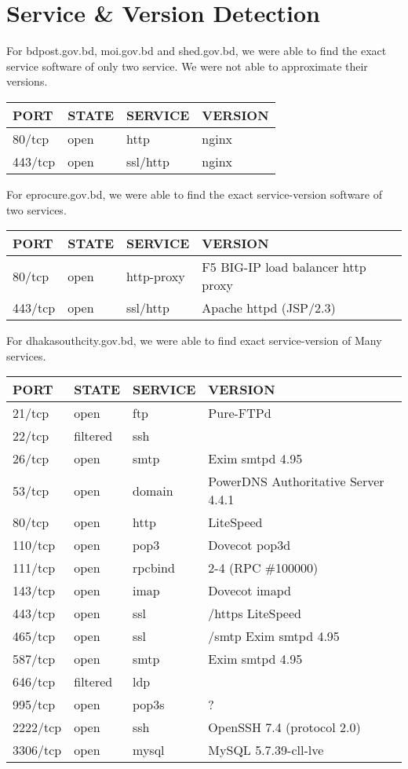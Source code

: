 \documentclass[11pt]{article}
\begin{document}
\section{Service \& Version Detection}
\label{sec:orgf64a93e}
For bdpost.gov.bd, moi.gov.bd and shed.gov.bd, we were able to find the exact service software of only two service. We were not able to approximate their versions.\\

\begin{center}
\begin{tabular}{llll}
PORT & STATE & SERVICE & VERSION\\
\hline
80/tcp & open & http & nginx\\
443/tcp & open & ssl/http & nginx\\
\end{tabular}
\end{center}

For eprocure.gov.bd, we were able to find the exact service-version software of two services.\\
\begin{center}
\begin{tabular}{llll}
PORT & STATE & SERVICE & VERSION\\
\hline
80/tcp & open & http-proxy & F5 BIG-IP load balancer http proxy\\
443/tcp & open & ssl/http & Apache httpd (JSP/2.3)\\
\end{tabular}
\end{center}

For dhakasouthcity.gov.bd, we were able to find exact service-version of Many services.\\
\begin{center}
\begin{tabular}{llll}
PORT & STATE & SERVICE & VERSION\\
\hline
21/tcp & open & ftp & Pure-FTPd\\
22/tcp & filtered & ssh & \\
26/tcp & open & smtp & Exim smtpd 4.95\\
53/tcp & open & domain & PowerDNS Authoritative Server 4.4.1\\
80/tcp & open & http & LiteSpeed\\
110/tcp & open & pop3 & Dovecot pop3d\\
111/tcp & open & rpcbind & 2-4 (RPC \#100000)\\
143/tcp & open & imap & Dovecot imapd\\
443/tcp & open & ssl & /https LiteSpeed\\
465/tcp & open & ssl & /smtp  Exim smtpd 4.95\\
587/tcp & open & smtp & Exim smtpd 4.95\\
646/tcp & filtered & ldp & \\
995/tcp & open & pop3s & ?\\
2222/tcp & open & ssh & OpenSSH 7.4 (protocol 2.0)\\
3306/tcp & open & mysql & MySQL 5.7.39-cll-lve\\
\end{tabular}
\end{center}
\end{document}
